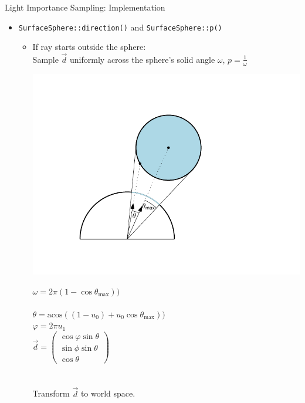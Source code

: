 \documentclass[utf8,stillsansserifmath,fleqn,t]{beamer}
\newcommand{\code}[1]{\texttt{#1}}
\begin{document}
\begin{frame}
\frametitle{\insertsection}
Light Importance Sampling: Implementation
\begin{itemize}
\item \code{SurfaceSphere::direction()} and \code{SurfaceSphere::p()}
    \begin{itemize}
    \item If ray starts outside the sphere:\\
        Sample $\vec{d}$ uniformly across the sphere's solid angle $\omega$, $p=\frac{1}{\omega}$\\
        \begin{minipage}{.42\textwidth}
        \includegraphics[width=\textwidth]{./fig/direction-to-sphere-outside.pdf}
        \end{minipage}\hfill
        \begin{minipage}{.42\textwidth}
        $\omega = 2\pi (1-\cos\theta_{\max}))$\\~\\
        $\theta =\text{acos}((1-u_0)+u_0 \cos\theta_{\max}))$\\
        $\varphi = 2\pi u_1$\\
        $\vec{d} = \begin{pmatrix}\cos\varphi\sin\theta\\ \sin\phi\sin\theta\\ \cos\theta\end{pmatrix}$\\~\\~\\
        Transform $\vec{d}$ to world space.
        \end{minipage}
    \end{itemize}
\end{itemize}
\end{frame}
\end{document}
